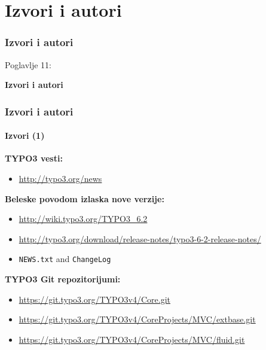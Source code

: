 %

\section{Izvori i autori}
\begin{frame}[fragile]
	\frametitle{Izvori i autori}

	\begin{center}\huge{Poglavlje 11:}\end{center}
	\begin{center}\huge{\color{typo3darkgrey}\textbf{Izvori i autori}}\end{center}

\end{frame}


\begin{frame}[fragile]
	\frametitle{Izvori i autori}
	\framesubtitle{Izvori (1)}

	\textbf{TYPO3 vesti:}
		\begin{itemize}\smaller
			\item \url{http://typo3.org/news}
		\end{itemize}

	\textbf{Beleske povodom izlaska nove verzije:}
		\begin{itemize}\smaller
			\item \url{http://wiki.typo3.org/TYPO3_6.2}
			\item \url{http://typo3.org/download/release-notes/typo3-6-2-release-notes/}
			\item \texttt{NEWS.txt} and \texttt{ChangeLog}
		\end{itemize}

	\textbf{TYPO3 Git repozitorijumi:}
		\begin{itemize}\smaller
			\item \url{https://git.typo3.org/TYPO3v4/Core.git}
			\item \url{https://git.typo3.org/TYPO3v4/CoreProjects/MVC/extbase.git}
			\item \url{https://git.typo3.org/TYPO3v4/CoreProjects/MVC/fluid.git}
		\end{itemize}

\end{frame}

